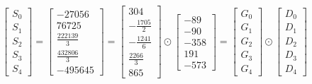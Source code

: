 \documentclass{article}%
\begin{document}
\[%
\left[\begin{matrix}S_{0}\\S_{1}\\S_{2}\\S_{3}\\S_{4}\end{matrix}\right] = \left[\begin{matrix}-27056\\76725\\\frac{222139}{3}\\\frac{432806}{3}\\-495645\end{matrix}\right] = \left[\begin{matrix}304\\- \frac{1705}{2}\\- \frac{1241}{6}\\\frac{2266}{3}\\865\end{matrix}\right] \odot \left[\begin{matrix}-89\\-90\\-358\\191\\-573\end{matrix}\right] = \left[\begin{matrix}G_{0}\\G_{1}\\G_{2}\\G_{3}\\G_{4}\end{matrix}\right] \odot \left[\begin{matrix}D_{0}\\D_{1}\\D_{2}\\D_{3}\\D_{4}\end{matrix}\right]%
\]%
\end{document}
